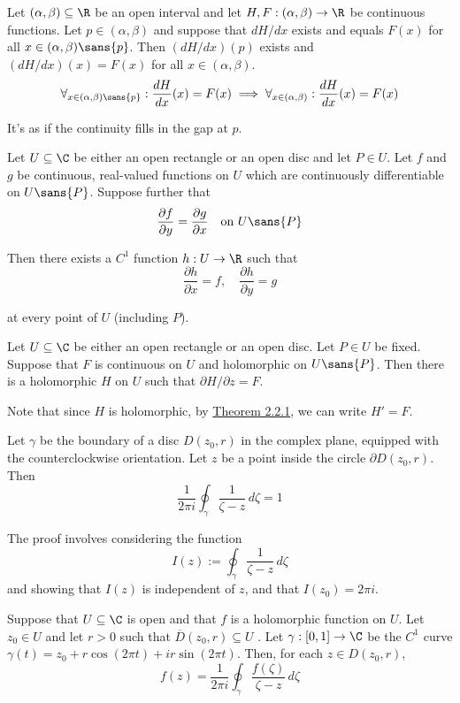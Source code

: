 \label{f8abd8b}

Let $(\alpha,\beta)\subseteq\R$ be an open interval and let
$H,F:(\alpha,\beta)\to\R$ be continuous functions. Let $p\in(\alpha,\beta)$ and
suppose that $dH/dx$ exists and equals $F(x)$ for all
$x\in(\alpha,\beta)\sans{p}$. Then $(dH/dx)(p)$ exists and $(dH/dx)(x)=F(x)$
for all $x\in(\alpha,\beta)$.
$$
  \forall_{x\in(\alpha,\beta)\sans{p}}:\frac{dH}{dx}(x)=F(x)\implies
  \forall_{x\in(\alpha,\beta)}:\frac{dH}{dx}(x)=F(x)
$$

It's as if the continuity fills in the gap at $p$.

\label{f017dd0}

Let $U\subseteq\C$ be either an open rectangle or an open disc and let $P\in
U$. Let $f$ and $g$ be continuous, real-valued functions on $U$ which are
continuously differentiable on $U\sans{P}$. Suppose further that
$$
  \frac{\partial f}{\partial y}=\frac{\partial g}{\partial x}
  \quad\text{on }U\sans{P}
$$

Then there exists a $C^1$ function $h:U\to\R$ such that
$$
  \frac{\partial h}{\partial x}=f,\quad
  \frac{\partial h}{\partial y}=g
$$

at every point of $U$ (including $P$).

\label{b2d9d89}

Let $U\subseteq\C$ be either an open rectangle or an open disc. Let $P\in U$ be
fixed. Suppose that $F$ is continuous on $U$ and holomorphic on $U\sans{P}$.
Then there is a holomorphic $H$ on $U$ such that $\partial H/\partial z=F$.

Note that since $H$ is holomorphic, by \href{f75e43c}{Theorem 2.2.1}, we can
write $H'=F$.

\label{c6c594a}

Let $\gamma$ be the boundary of a disc $D(z_0,r)$ in the complex plane,
equipped with the counterclockwise orientation. Let $z$ be a point inside the
circle $\partial D(z_0,r)$. Then
$$
  \frac1{2\pi i}\oint_\gamma\frac1{\zeta-z}\,d\zeta=1
$$

The proof involves considering the function
$$
  I(z):=\oint_\gamma\frac1{\zeta-z}\,d\zeta
$$
and showing that $I(z)$ is independent of $z$, and that $I(z_0)=2\pi i$.

\label{e50677f}

Suppose that $U\subseteq\C$ is open and that $f$ is a holomorphic function on
$U$. Let $z_0\in U$ and let $r>0$ such that $\overline D(z_0,r)\subseteq U$ .
Let $\gamma:[0,1]\to\C$ be the $C^1$ curve $\gamma(t)=z_0+r\cos(2\pi
t)+ir\sin(2\pi t)$. Then, for each $z\in D(z_0,r)$,
$$
  f(z)=\frac1{2\pi i}\oint_\gamma\frac{f(\zeta)}{\zeta-z}\,d\zeta
$$

